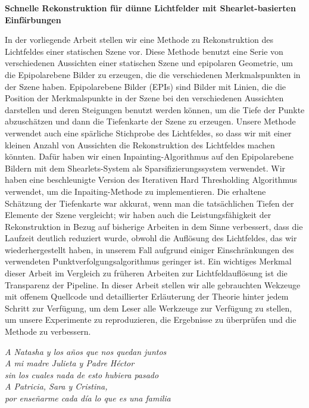 \documentclass[11pt, english, singlespacing, headsepline, ]{MastersDoctoralThesis}
\theoremstyle{definition}
\begin{document}
\begin{center}
\textbf{Schnelle Rekonstruktion für dünne Lichtfelder mit Shearlet-basierten Einf\"arbungen}
\end{center}

In der vorliegende Arbeit stellen wir eine Methode zu Rekonstruktion des Lichtfeldes einer statischen Szene vor. Diese Methode benutzt eine Serie von verschiedenen Aussichten einer statischen Szene und epipolaren Geometrie, um die Epipolarebene Bilder zu erzeugen, die die verschiedenen Merkmalspunkten in der Szene haben. Epipolarebene Bilder (EPIs) sind Bilder mit Linien, die die Position der Merkmalspunkte in der Szene bei den verschiedenen Aussichten darstellen und deren Steigungen benutzt werden können, um die Tiefe der Punkte abzuschätzen und dann die Tiefenkarte der Szene zu erzeugen. Unsere Methode verwendet auch eine spärliche Stichprobe des Lichtfeldes, so dass wir mit einer kleinen Anzahl von Aussichten die Rekonstruktion des Lichtfeldes machen könnten. Dafür haben wir einen Inpainting-Algorithmus auf den Epipolarebene Bildern mit dem Shearlets-System als Sparsifizierungssystem verwendet. Wir haben eine beschleunigte Version des Iterativen Hard Thresholding Algorithmus verwendet, um die Inpaiting-Methode zu implementieren. Die erhaltene Schätzung der Tiefenkarte war akkurat, wenn man die tatsächlichen Tiefen der Elemente der Szene vergleicht; wir haben auch die Leistungsfähigkeit der Rekonstruktion in Bezug auf bisherige Arbeiten in dem Sinne verbessert, dass die Laufzeit deutlich reduziert wurde, obwohl die Auflösung des Lichtfeldes, das wir wiederhergestellt haben, in unserem Fall aufgrund einiger Einschränkungen des verwendeten Punktverfolgungsalgorithmus geringer ist. Ein wichtiges Merkmal dieser Arbeit im Vergleich zu früheren Arbeiten zur Lichtfeldauflösung ist die Transparenz der Pipeline. In dieser Arbeit stellen wir alle gebrauchten Wekzeuge mit offenem Quellcode und detaillierter Erläuterung der Theorie hinter jedem Schritt zur Verfügung, um dem Leser alle Werkzeuge zur Verfügung zu stellen, um unsere Experimente zu reproduzieren, die Ergebnisse zu überprüfen und die Methode zu verbessern.


\clearpage\pagestyle{empty}
\begin{flushleft}
\textit{A Natasha y los años que nos quedan juntos\\
A mi madre Julieta y Padre Héctor \\
sin los cuales nada de esto hubiera pasado\\
A Patricia, Sara y Cristina, \\
por enseñarme cada día lo que es una familia}
\end{flushleft}
\end{document}
